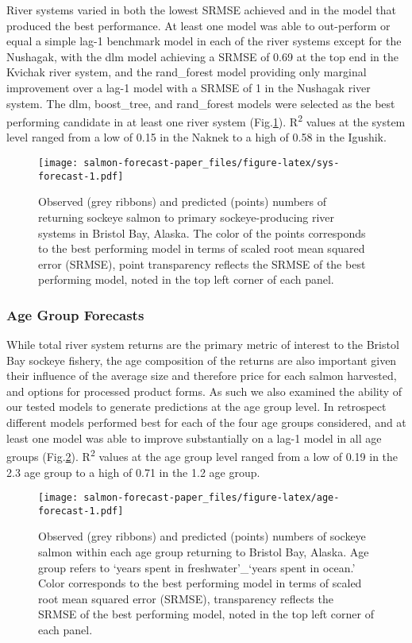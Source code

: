 \documentclass[
]{article}
\begin{document}
River systems varied in both the lowest SRMSE achieved and in the model that produced the best performance. At least one model was able to out-perform or equal a simple lag-1 benchmark model in each of the river systems except for the Nushagak, with the dlm model achieving a SRMSE of 0.69 at the top end in the Kvichak river system, and the rand\_forest model providing only marginal improvement over a lag-1 model with a SRMSE of 1 in the Nushagak river system. The dlm, boost\_tree, and rand\_forest models were selected as the best performing candidate in at least one river system (Fig.\ref{fig:sys-forecast}). R\textsuperscript{2} values at the system level ranged from a low of 0.15 in the Naknek to a high of 0.58 in the Igushik.

\begin{figure}
\centering
\texttt{[image: salmon-forecast-paper\_files/figure-latex/sys-forecast-1.pdf]}
\caption{\label{fig:sys-forecast}Observed (grey ribbons) and predicted (points) numbers of returning sockeye salmon to primary sockeye-producing river systems in Bristol Bay, Alaska. The color of the points corresponds to the best performing model in terms of scaled root mean squared error (SRMSE), point transparency reflects the SRMSE of the best performing model, noted in the top left corner of each panel.}
\end{figure}

\hypertarget{age-group-forecasts}{%
\subsubsection*{Age Group Forecasts}\label{age-group-forecasts}}

While total river system returns are the primary metric of interest to the Bristol Bay sockeye fishery, the age composition of the returns are also important given their influence of the average size and therefore price for each salmon harvested, and options for processed product forms. As such we also examined the ability of our tested models to generate predictions at the age group level. In retrospect different models performed best for each of the four age groups considered, and at least one model was able to improve substantially on a lag-1 model in all age groups (Fig.\ref{fig:age-forecast}). R\textsuperscript{2} values at the age group level ranged from a low of 0.19 in the 2.3 age group to a high of 0.71 in the 1.2 age group.

\begin{figure}
\centering
\texttt{[image: salmon-forecast-paper\_files/figure-latex/age-forecast-1.pdf]}
\caption{\label{fig:age-forecast}Observed (grey ribbons) and predicted (points) numbers of sockeye salmon within each age group returning to Bristol Bay, Alaska. Age group refers to `years spent in freshwater'\_`years spent in ocean.' Color corresponds to the best performing model in terms of scaled root mean squared error (SRMSE), transparency reflects the SRMSE of the best performing model, noted in the top left corner of each panel.}
\end{figure}
\end{document}
